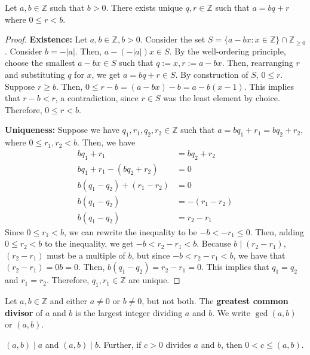 \documentclass [12pt] {article}
\newcommand{\Z}{\mathbb{Z}}
\newenvironment{definition}[1]{\begin{tcolorbox}[title={Definition: #1},colback=blue!5!white,colframe=black!75!blue]}{\end{tcolorbox}}
\newenvironment{theorem}[1]{\begin{tcolorbox}[title={Theorem #1},colback=green!5!white,colframe=black!75!green]}{\end{tcolorbox}}
\renewcommand{\bf}[1]{\textbf{{#1}}}
\begin{document}
\begin{theorem}{(Division Algorithm)}
    \label{thm:divalgo}
    Let $a, b \in \Z$ such that $b > 0$. There exists unique $q, r \in \Z$ such that $a = bq + r$
    where $0 \leq r < b$.
\end{theorem}
\begin{proof}
    \bf{Existence:}
    Let $a, b \in \Z, b > 0$. Consider the set $S = \{ a - bx : x \in \Z \} \cap \Z_{\geq 0}$.
    Consider $b = -|a|$. Then, $a - (-|a|)x \in S$. By the well-ordering principle, choose the
    smallest $a - bx \in S$ such that $q := x, r := a - bx$. Then, rearranging $r$ and substituting
    $q$ for $x$, we get $a = bq + r \in S$. By construction of $S$, $0 \leq r$. Suppose $r \geq b$.
    Then, $0 \leq r - b = (a - bx) - b = a - b(x - 1)$. This implies that $r - b < r$, a
    contradiction, since $r \in S$ was the least element by choice. Therefore, $0 \leq r < b$.
    \vspace{0.5em}

    \bf{Uniqueness:}
    Suppose we have $q_1, r_1, q_2, r_2 \in \Z$ such that $a = bq_1 + r_1 = bq_2 + r_2$, where
    $0 \leq r_1, r_2 < b$. Then, we have
    \begin{align*}
        bq_1 + r_1 &= bq_2 + r_2 \\
        bq_1 + r_1 - (bq_2 + r_2) &= 0 \\
        b(q_1 - q_2) + (r_1 - r_2) &= 0 \\
        b(q_1 - q_2) &= -(r_1 - r_2) \\
        b(q_1 - q_2) &= r_2 - r_1
    \end{align*}
    Since $0 \leq r_1 < b$, we can rewrite the inequality to be $-b < -r_1 \leq 0$. Then, adding $0
    \leq r_2 < b$ to the inequality, we get $-b < r_2 - r_1 < b$. Because $b \mid (r_2 - r_1)$,
    $(r_2 - r_1)$ must be a multiple of $b$, but since $-b < r_2 - r_1 < b$, we have that
    $(r_2 - r_1) = 0b = 0$. Then, $b(q_1 - q_2) = r_2 - r_1 = 0$. This implies that $q_1 = q_2$ and
    $r_1 = r_2$. Therefore, $q_1, r_1 \in \Z$ are unique.
\end{proof}

\begin{definition}{Greatest Common Divisor (gcd)}
    Let $a, b \in \Z$ and either $a \neq 0$ or $b \neq 0$, but not both. The \bf{greatest common
    divisor} of $a$ and $b$ is the largest integer dividing $a$ and $b$. We write $\gcd(a, b)$ or
    $(a, b)$. \vspace{1em}

    $(a, b) \mid a$ and $(a, b) \mid b$. Further, if $c > 0$ divides $a$ and $b$, then $0 < c \leq (a, b)$.
\end{definition}
\end{document}
